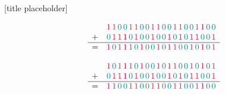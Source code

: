 \documentclass{beamer}
\newcommand{\coloredOne}{{\color{carminered} 1}}
\newcommand{\coloredZero}{{\color{darkcyan} 0}}
\begin{document}
\begin{frame}{[title placeholder]}

\begin{equation*}
\begin{array}{rl}
  & \coloredOne \,\coloredOne\, \coloredZero \, \coloredZero \,\coloredOne\,\coloredOne\, \coloredZero \, \coloredZero \,\coloredOne\,\coloredOne\, \coloredZero \, \coloredZero \,\coloredOne\,\coloredOne\, \coloredZero \, \coloredZero \,\coloredOne\,\coloredOne\, \coloredZero \, \coloredZero \\
+ & \coloredZero \,\coloredOne\,\coloredOne\,\coloredOne\, \coloredZero \,\coloredOne\, \coloredZero \, \coloredZero \,\coloredOne\, \coloredZero \, \coloredZero \,\coloredOne\, \coloredZero \,\coloredOne\, \coloredZero \,\coloredOne\,\coloredOne\, \coloredZero \, \coloredZero \,\coloredOne\\ \hline
= &  \coloredOne \, \coloredZero \,\coloredOne\,\coloredOne\,\coloredOne\, \coloredZero \,\coloredOne\, \coloredZero \, \coloredZero \,\coloredOne\, \coloredZero \,\coloredOne\,\coloredOne\, \coloredZero \, \coloredZero \,\coloredOne\, \coloredZero \,\coloredOne\, \coloredZero \,\coloredOne
\end{array}
\end{equation*}

\begin{equation*}
\begin{array}{rl}
  & \coloredOne\,\coloredZero\,\coloredOne\,\coloredOne\,\coloredOne\,\coloredZero\,\coloredOne\,\coloredZero\,\coloredZero\,\coloredOne\,\coloredZero\,\coloredOne\,\coloredOne\,\coloredZero\,\coloredZero\,\coloredOne\,\coloredZero\,\coloredOne\,\coloredZero\,\coloredOne \\
+ & \coloredZero \,\coloredOne\,\coloredOne\,\coloredOne\,\coloredZero\,\coloredOne\,\coloredZero\,\coloredZero\,\coloredOne\,\coloredZero\,\coloredZero\,\coloredOne\,\coloredZero\,\coloredOne\,\coloredZero\,\coloredOne\,\coloredOne\,\coloredZero\,\coloredZero\,\coloredOne\\ \hline
= & \coloredOne\,\coloredOne\,\coloredZero\,\coloredZero\,\coloredOne\,\coloredOne\,\coloredZero\,\coloredZero\,\coloredOne\,\coloredOne\,\coloredZero\,\coloredZero\,\coloredOne\,\coloredOne\,\coloredZero\,\coloredZero\,\coloredOne\,\coloredOne\,\coloredZero\,\coloredZero
\end{array}
\end{equation*}

\end{frame}
\end{document}
